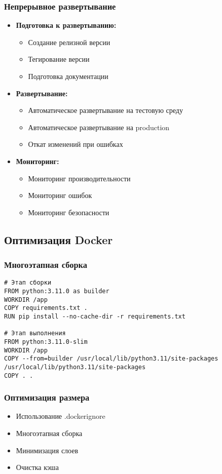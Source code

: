 \documentclass[12pt,a4paper]{article}
\begin{document}
\subsubsection{Непрерывное развертывание}
\begin{itemize}
    \item \textbf{Подготовка к развертыванию:}
    \begin{itemize}
        \item Создание релизной версии
        \item Тегирование версии
        \item Подготовка документации
    \end{itemize}
    \item \textbf{Развертывание:}
    \begin{itemize}
        \item Автоматическое развертывание на тестовую среду
        \item Автоматическое развертывание на production
        \item Откат изменений при ошибках
    \end{itemize}
    \item \textbf{Мониторинг:}
    \begin{itemize}
        \item Мониторинг производительности
        \item Мониторинг ошибок
        \item Мониторинг безопасности
    \end{itemize}
\end{itemize}

\subsection{Оптимизация Docker}
\subsubsection{Многоэтапная сборка}
\begin{verbatim}
# Этап сборки
FROM python:3.11.0 as builder
WORKDIR /app
COPY requirements.txt .
RUN pip install --no-cache-dir -r requirements.txt

# Этап выполнения
FROM python:3.11.0-slim
WORKDIR /app
COPY --from=builder /usr/local/lib/python3.11/site-packages /usr/local/lib/python3.11/site-packages
COPY . .
\end{verbatim}

\subsubsection{Оптимизация размера}
\begin{itemize}
    \item Использование .dockerignore
    \item Многоэтапная сборка
    \item Минимизация слоев
    \item Очистка кэша
\end{itemize}
\end{document}
